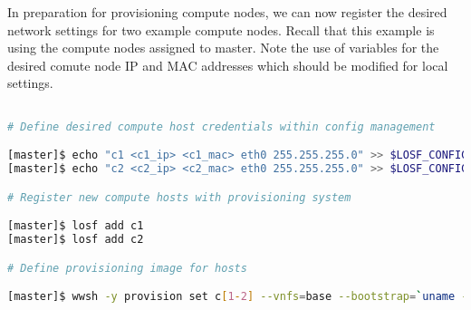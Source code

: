 \documentclass[letterpaper]{article}
\begin{document}


In preparation for provisioning compute nodes, we can now register the desired
network settings for two example compute nodes. Recall that this example is
using the compute nodes assigned to master. Note the use of variables for the
desired comute node IP and MAC addresses which should be modified for local
settings. 

\vspace*{0.2cm}

\begin{lstlisting}[language=bash,keywords={},upquote=true,basicstyle=\footnotesize\ttfamily]

# Define desired compute host credentials within config management

[master]$ echo "c1 <c1_ip> <c1_mac> eth0 255.255.255.0" >> $LOSF_CONFIG_DIR/ips.cluster
[master]$ echo "c2 <c2_ip> <c2_mac> eth0 255.255.255.0" >> $LOSF_CONFIG_DIR/ips.cluster

# Register new compute hosts with provisioning system

[master]$ losf add c1
[master]$ losf add c2

# Define provisioning image for hosts

[master]$ wwsh -y provision set c[1-2] --vnfs=base --bootstrap=`uname -r`

\end{lstlisting}
\end{document}
